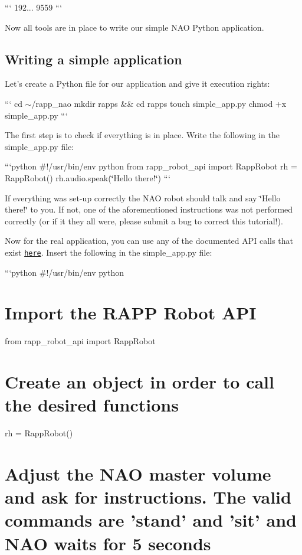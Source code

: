 ``` 192... 9559 ```

Now all tools are in place to write our simple N\-A\-O Python application.

\subsection*{Writing a simple application}

Let's create a Python file for our application and give it execution rights\-:

``` cd $\sim$/rapp\-\_\-nao mkdir rapps \&\& cd rapps touch simple\-\_\-app.\-py chmod +x simple\-\_\-app.\-py ```

The first step is to check if everything is in place. Write the following in the {\ttfamily simple\-\_\-app.\-py} file\-:

```python \#!/usr/bin/env python from rapp\-\_\-robot\-\_\-api import Rapp\-Robot rh = Rapp\-Robot() rh.\-audio.\-speak(\char`\"{}\-Hello there!\char`\"{}) ```

If everything was set-\/up correctly the N\-A\-O robot should talk and say \char`\"{}\-Hello there!\char`\"{} to you. If not, one of the aforementioned instructions was not performed correctly (or if it they all were, please submit a bug to correct this tutorial!).

Now for the real application, you can use any of the documented A\-P\-I calls that exist \href{https://github.com/rapp-project/rapp-robots-api/tree/master/python}{\tt here}. Insert the following in the {\ttfamily simple\-\_\-app.\-py} file\-:

```python \#!/usr/bin/env python

\section*{Import the R\-A\-P\-P Robot A\-P\-I}

from rapp\-\_\-robot\-\_\-api import Rapp\-Robot \section*{Create an object in order to call the desired functions}

rh = Rapp\-Robot()

\section*{Adjust the N\-A\-O master volume and ask for instructions. The valid commands are 'stand' and 'sit' and N\-A\-O waits for 5 seconds}

